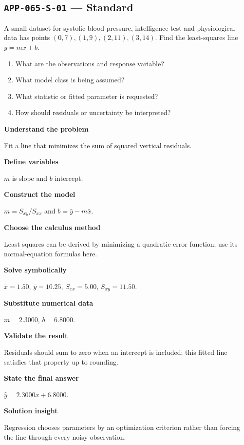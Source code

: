 \documentclass[11pt]{book}
\newcommand{\pid}[1]{\texttt{#1}}
\begin{document}
\subsection*{\pid{APP-065-S-01} — Standard}
\begin{problembox}
A small dataset for systolic blood pressure, intelligence-test and physiological data has points $(0,7),(1,9),(2,11),(3,14)$. Find the least-squares line $y=mx+b$.
\end{problembox}
\begin{promptbox}\begin{enumerate}
\item What are the observations and response variable?
\item What model class is being assumed?
\item What statistic or fitted parameter is requested?
\item How should residuals or uncertainty be interpreted?
\end{enumerate}\end{promptbox}
\begin{solutionbox}
\textbf{Understand the problem}\par Fit a line that minimizes the sum of squared vertical residuals.\par\medskip
\textbf{Define variables}\par $m$ is slope and $b$ intercept.\par\medskip
\textbf{Construct the model}\par $m=S_{xy}/S_{xx}$ and $b=\bar y-m\bar x$.\par\medskip
\textbf{Choose the calculus method}\par Least squares can be derived by minimizing a quadratic error function; use its normal-equation formulas here.\par\medskip
\textbf{Solve symbolically}\par $\bar x=1.50$, $\bar y=10.25$, $S_{xx}=5.00$, $S_{xy}=11.50$.\par\medskip
\textbf{Substitute numerical data}\par $m=2.3000$, $b=6.8000$.\par\medskip
\textbf{Validate the result}\par Residuals should sum to zero when an intercept is included; this fitted line satisfies that property up to rounding.\par\medskip
\textbf{State the final answer}\par $\hat y=2.3000x+6.8000$.\par\medskip
\textbf{Solution insight}\par Regression chooses parameters by an optimization criterion rather than forcing the line through every noisy observation.\par\medskip
\end{solutionbox}
\end{document}
